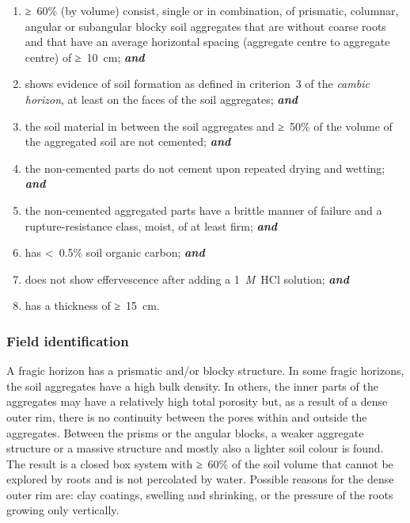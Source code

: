 \documentclass[
  letterpaper,
  DIV=11,
  numbers=noendperiod]{scrreprt}
\providecommand{\tightlist}{%
  \setlength{\itemsep}{0pt}\setlength{\parskip}{0pt}}\usepackage{longtable,booktabs,array}
\begin{document}
\begin{enumerate}
\def\labelenumi{\arabic{enumi}.}
\tightlist
\item
  ≥~60\% (by volume) consist, single or in combination, of prismatic,
  columnar, angular or subangular blocky soil aggregates that are
  without coarse roots and that have an average horizontal spacing
  (aggregate centre to aggregate centre) of ≥~10~cm; \textbf{\emph{and}}
\item
  shows evidence of soil formation as defined in criterion~3 of the
  \emph{cambic horizon}, at least on the faces of the soil aggregates;
  \textbf{\emph{and}}
\item
  the soil material in between the soil aggregates and ≥~50\% of the
  volume of the aggregated soil are not cemented; \textbf{\emph{and}}
\item
  the non-cemented parts do not cement upon repeated drying and wetting;
  \textbf{\emph{and}}
\item
  the non-cemented aggregated parts have a brittle manner of failure and
  a rupture-resistance class, moist, of at least firm;
  \textbf{\emph{and}}
\item
  has \textless~0.5\% soil organic carbon; \textbf{\emph{and}}
\item
  does not show effervescence after adding a 1~\emph{M}~HCl solution;
  \textbf{\emph{and}}
\item
  has a thickness of ≥~15~cm.
\end{enumerate}

\hypertarget{field-identification-8}{%
\subsubsection{Field identification}\label{field-identification-8}}

A fragic horizon has a prismatic and/or blocky structure. In some fragic
horizons, the soil aggregates have a high bulk density. In others, the
inner parts of the aggregates may have a relatively high total porosity
but, as a result of a dense outer rim, there is no continuity between
the pores within and outside the aggregates. Between the prisms or the
angular blocks, a weaker aggregate structure or a massive structure and
mostly also a lighter soil colour is found. The result is a closed box
system with ≥~60\% of the soil volume that cannot be explored by roots
and is not percolated by water. Possible reasons for the dense outer rim
are: clay coatings, swelling and shrinking, or the pressure of the roots
growing only vertically.
\end{document}
